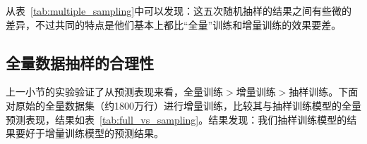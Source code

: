 从表~\ref{tab:multiple_sampling}中可以发现：这五次随机抽样的结果之间有些微的差异，不过共同的特点是他们基本上都比“全量”训练和增量训练的效果要差。

\subsection{全量数据抽样的合理性}
上一小节的实验验证了从预测表现来看，全量训练$>$增量训练$>$抽样训练。下面对原始的全量数据集（约1800万行）进行增量训练，比较其与抽样训练模型的全量预测表现，结果如表~\ref{tab:full_vs_sampling}。结果发现：我们抽样训练模型的结果要好于增量训练模型的预测结果。
\begin{table}[htbp]
	\centering
	\caption{全量数据的增量结果与$5\%$抽样的对比}
	\label{tab:full_vs_sampling}%
\end{table}%


